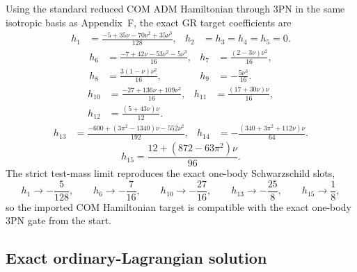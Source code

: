 \documentclass[11pt]{article}
\begin{document}
Using the standard reduced COM ADM Hamiltonian through $3$PN in the same
isotropic basis as Appendix~F, the exact GR target coefficients are
\begin{equation}
\begin{aligned}
 h_1&=\frac{-5+35\nu-70\nu^2+35\nu^3}{128},
 & h_2&=h_3=h_4=h_5=0.
\end{aligned}
\label{eq:app-gr-com-target-h-1-5}
\end{equation}
\begin{equation}
\begin{aligned}
 h_6&=\frac{-7+42\nu-53\nu^2-5\nu^3}{16},
 & h_7&=\frac{(2-3\nu)\nu^2}{16},
\\[0.5ex]
 h_8&=\frac{3(1-\nu)\nu^2}{16},
 & h_9&=-\frac{5\nu^3}{16}.
\end{aligned}
\label{eq:app-gr-com-target-h-6-9}
\end{equation}
\begin{equation}
\begin{aligned}
 h_{10}&=\frac{-27+136\nu+109\nu^2}{16},
 & h_{11}&=\frac{(17+30\nu)\nu}{16},
\\[0.5ex]
 h_{12}&=\frac{(5+43\nu)\nu}{12}.
\end{aligned}
\label{eq:app-gr-com-target-h-10-12}
\end{equation}
\begin{equation}
\begin{aligned}
 h_{13}&=\frac{-600+(3\pi^2-1340)\nu-552\nu^2}{192},
 & h_{14}&=-\frac{(340+3\pi^2+112\nu)\nu}{64}.
\end{aligned}
\label{eq:app-gr-com-target-h-13-14}
\end{equation}
\begin{equation}
 h_{15}=\frac{12+(872-63\pi^2)\nu}{96}.
\label{eq:app-gr-com-target-h-15}
\end{equation}
The strict test-mass limit reproduces the exact one-body Schwarzschild slots,
\begin{equation}
 h_1\to -\frac{5}{128},
\qquad
 h_6\to -\frac{7}{16},
\qquad
 h_{10}\to -\frac{27}{16},
\qquad
 h_{13}\to -\frac{25}{8},
\qquad
 h_{15}\to \frac18,
\label{eq:app-gr-com-target-test-mass-h}
\end{equation}
so the imported COM Hamiltonian target is compatible with the exact one-body
$3$PN gate from the start.

\subsection{Exact ordinary-Lagrangian solution}
\label{app:gr-com-target-solution}
\end{document}
